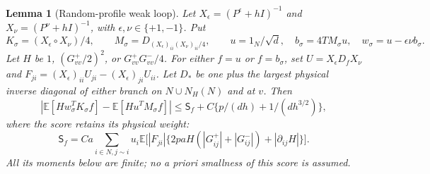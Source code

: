 \documentclass[10pt]{article}
\numberwithin{equation}{section}
\newtheorem{lemma}{Lemma}[section]
\newcommand{\1}{\mathbf1}
\begin{document}
\begin{lemma}[Random-profile weak loop]\label{lem:random-weak}
Let $X_\epsilon=(P^\epsilon+hI)^{-1}$ and
$X_\nu=(P^\nu+hI)^{-1}$, with $\epsilon,\nu\in\{+1,-1\}$.
Put
\[
 K_\sigma=(X_\epsilon\circ X_\nu)/4,\qquad
 M_\sigma=D_{(X_\epsilon)_{ii}(X_\nu)_{ii}/4},\qquad
 u=1_N/\sqrt d,\quad b_\sigma=4TM_\sigma u,\quad
 w_\sigma=u-\epsilon\nu b_\sigma.
\]
Let $H$ be $1$, $(G^+_{vv}/2)^2$, or $G^+_{vv}G^-_{vv}/4$.
For either $f=u$ or $f=b_\sigma$, set $U=X_\epsilon D_fX_\nu$ and
$F_{ji}=(X_\epsilon)_{ii}U_{ji}-(X_\epsilon)_{ji}U_{ii}$.
Let $D_*$ be one plus the largest physical inverse diagonal of either
branch on $N\cup N_H(N)$ and at $v$. Then
\[
 \left|\mathbb E[H w_\sigma^TK_\sigma f]
                  -\mathbb E[H u^TM_\sigma f]\right|
 \le \mathsf S_f+C\{p/(dh)+1/(dh^{3/2})\},
 \tag{W1}\label{eq:random-weak-error}
\]
where the score retains its physical weight:
\[
 \mathsf S_f=Ca\sum_{i\in N,j\sim i}u_i\mathbb E\bigl[
 |F_{ji}|\{2paH(|G^+_{ij}|+|G^-_{ij}|)+|\partial_{ij}H|\}\bigr].
\]
All its moments below are finite; no a priori smallness of this score
is assumed.
\end{lemma}
\end{document}
